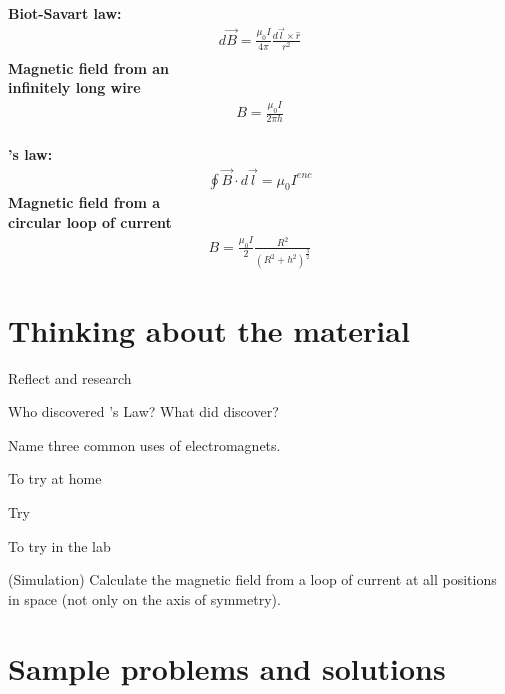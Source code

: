 \newpage
\begin{importantEquations}
\medskip
\begin{multicols}{2}
\textbf{Biot-Savart law:}
\begin{align*}
d\vec B = \frac{\mu_0 I}{4\pi}\frac{d\vec l\times \hat r}{r^2}\\
\end{align*}
\textbf{Magnetic field from an\\ infinitely long wire}
\begin{align*}
B = \frac{\mu_0 I}{2\pi h}
\end{align*}
\columnbreak
\\
\textbf{\ampere's law:}
\begin{align*}
\oint \vec B \cdot d\vec l =\mu_0 I^{enc}
\end{align*}
\textbf{Magnetic field from a \\ circular loop of current}
\begin{align*}
B=\frac{\mu_0 I}{2} \frac{R^2}{(R^2+h^2)^\frac{3}{2}}
\end{align*}
\medskip
\end{multicols}
\end{importantEquations}

\newpage
\section{Thinking about the material}

\begin{chapteractivity}{Reflect and research}
{
\item Who discovered \ampere's Law? What did \amperesp discover?
\item Name three common uses of electromagnets.
}
\end{chapteractivity}

\begin{chapteractivity}{To try at home}
{
\item Try
}
\end{chapteractivity}

\begin{chapteractivity}{To try in the lab}
{
\item (Simulation) Calculate the magnetic field from a loop of current at all positions in space (not only on the axis of symmetry). 
}
\end{chapteractivity}

\newpage
\section{Sample problems and solutions}
